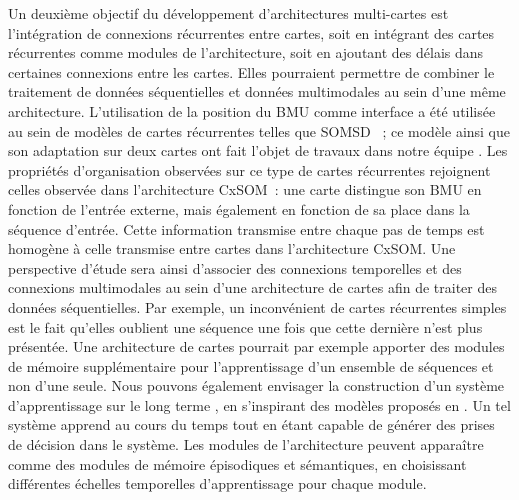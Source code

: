 Un deuxième objectif du développement d'architectures multi-cartes est l'intégration de connexions récurrentes entre cartes, soit en intégrant des cartes récurrentes comme modules de l'architecture, soit en ajoutant des délais dans certaines connexions entre les cartes. Elles pourraient permettre de combiner le traitement de données séquentielles et données multimodales au sein d'une même architecture.
L'utilisation de la position du BMU comme interface a été utilisée au sein de modèles de cartes récurrentes telles que SOMSD \parencite{hagenbuchner_self-organizing_2003}~; ce modèle ainsi que son adaptation sur deux cartes ont fait l'objet de travaux dans notre équipe \parencite{baheux_towards_2014, fix20}. 
Les propriétés d'organisation observées sur ce type de cartes récurrentes rejoignent celles observée dans l'architecture CxSOM~: une carte distingue son BMU en fonction de l'entrée externe, mais également en fonction de sa place dans la séquence d'entrée. Cette information transmise entre chaque pas de temps est homogène à celle transmise entre cartes dans l'architecture CxSOM.
Une perspective d'étude sera ainsi d'associer des connexions temporelles et des connexions multimodales au sein d'une architecture de cartes afin de traiter des données séquentielles.
Par exemple, un inconvénient de cartes récurrentes simples est le fait qu'elles oublient une séquence une fois que cette dernière n'est plus présentée. Une architecture de cartes pourrait par exemple apporter des modules de mémoire supplémentaire pour l'apprentissage d'un ensemble de séquences et non d'une seule.
Nous pouvons également envisager la construction d'un système d'apprentissage \og sur le long terme \fg{}, en s'inspirant des modèles proposés en \cite{parisiLL,parisi17}. Un tel système apprend au cours du temps tout en étant capable de générer des prises de décision dans le système. Les modules de l'architecture peuvent apparaître comme des modules de mémoire épisodiques et sémantiques, en choisissant différentes échelles temporelles d'apprentissage pour chaque module.

